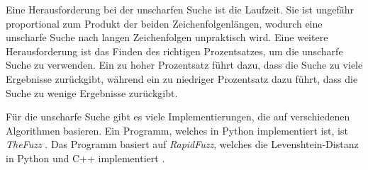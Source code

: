 Eine Herausforderung bei der unscharfen Suche ist die Laufzeit.
Sie ist ungefähr proportional zum Produkt der beiden Zeichenfolgenlängen, wodurch eine unscharfe Suche nach langen Zeichenfolgen unpraktisch wird.
Eine weitere Herausforderung ist das Finden des richtigen Prozentsatzes, um die unscharfe Suche zu verwenden.
Ein zu hoher Prozentsatz führt dazu, dass die Suche zu viele Ergebnisse zurückgibt, während ein zu niedriger Prozentsatz dazu führt, dass die Suche zu wenige Ergebnisse zurückgibt.

Für die unscharfe Suche gibt es viele Implementierungen, die auf verschiedenen Algorithmen basieren.
Ein Programm, welches in Python implementiert ist, ist \emph{TheFuzz} \autocite{bachmann_thefuzz_2023}.
Das Programm basiert auf \emph{RapidFuzz}, welches die Levenshtein-Distanz in Python und C++ implementiert \autocites{bachmann_rapidfuzz_2023}.
